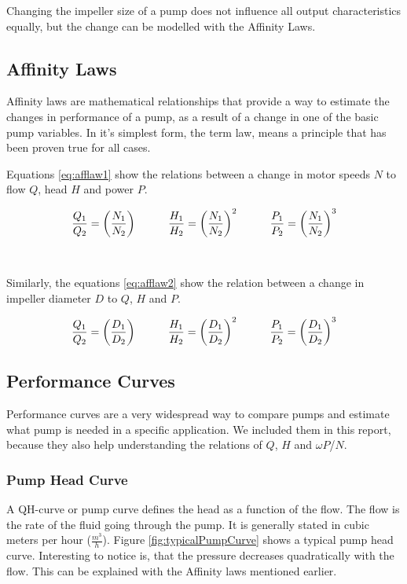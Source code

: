 Changing the impeller size of a pump does not influence all output characteristics equally,
but the change can be modelled with the Affinity Laws.

\subsection{Affinity Laws}
Affinity laws are mathematical relationships that provide a way to estimate the 
changes in performance of a pump, as a result of a change in one of the basic pump variables.
In it's simplest form, the term law, means a principle that has been proven true for all cases.

Equations \ref{eq:afflaw1} show the relations between a change in motor speeds $N$
to flow $Q$, head $H$ and power $P$.

\begin{equation}
	\frac{Q_1}{Q_2} = \left(\frac{N_1}{N_2}\right)
	\hspace{10mm}
	\frac{H_1}{H_2} = \left(\frac{N_1}{N_2}\right)^2
	\hspace{10mm}
	\frac{P_1}{P_2} = \left(\frac{N_1}{N_2}\right)^3
	\label{eq:afflaw1}	
\end{equation}
\cite{Volk2014}\\\\
Similarly, the equations \ref{eq:afflaw2} show the relation between a change in impeller diameter $D$
to  $Q$, $H$ and $P$.

\begin{equation}
	\frac{Q_1}{Q_2} = \left(\frac{D_1}{D_2}\right)
	\hspace{10mm}
	\frac{H_1}{H_2} = \left(\frac{D_1}{D_2}\right)^2
	\hspace{10mm}
	\frac{P_1}{P_2} = \left(\frac{D_1}{D_2}\right)^3
	\label{eq:afflaw2}	
\end{equation}
\cite{Volk2014}

\subsection{Performance Curves}
Performance curves are a very widespread way to compare pumps
and estimate what pump is needed in a specific application.
We included them in this report,
because they also help understanding the relations of $Q$, $H$ and $\omega P$/$N$.

\subsubsection{Pump Head Curve}
A QH-curve or pump curve defines the head as a function of the flow. 
The flow is the rate of the fluid going through the pump.
It is generally stated in cubic meters per hour ($\frac{m^{3}}{h}$).
Figure \ref{fig:typicalPumpCurve} shows a typical pump head curve.
Interesting to notice is,
that the pressure decreases quadratically with the flow.
This can be explained with the Affinity laws mentioned earlier.


